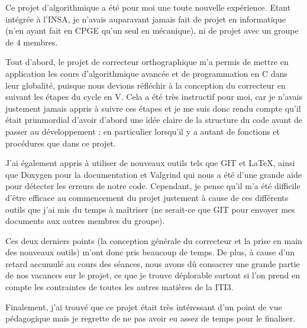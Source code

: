 	Ce projet d'algorithmique a été pour moi une toute nouvelle expérience. Etant intégrée à l'INSA, je n'avais auparavant jamais fait de projet en informatique (n'en ayant fait en CPGE qu'un seul en mécanique), ni de projet avec un groupe de 4 membres.
	
	Tout d'abord, le projet de correcteur orthographique m'a permis de mettre en application les cours d'algorithmique avancée et de programmation en C dans leur globalité, puisque nous devions réfléchir à la conception du correcteur en suivant les étapes du cycle en V. Cela a été très instructif pour moi, car je n'avais justement jamais appris à suivre ces étapes et je me suis donc rendu compte qu'il était primmordial d'avoir d'abord une idée claire de la structure du code avant de passer au développement ; en particulier lorsqu'il y a autant de fonctions et procédures que dans ce projet.
	
	J'ai également appris à utiliser de nouveaux outils tels que GIT et \LaTeX, ainsi que Doxygen pour la documentation et Valgrind qui nous a été d'une grande aide pour détecter les erreurs de notre code. Cependant, je pense qu'il m'a été difficile d'être efficace au commencement du projet justement à cause de ces différents outils que j'ai mis du temps à maîtriser (ne serait-ce que GIT pour envoyer mes documents aux autres membres du groupe).
	
	Ces deux derniers points (la conception générale du correcteur et la prise en main des nouveaux outils) m'ont donc pris beaucoup de temps. De plus, à cause d'un retard accumulé au cours des séances, nous avons dû consacrer une grande partie de nos vacances sur le projet, ce que je trouve déplorable surtout si l'on prend en compte les contraintes de toutes les autres matières de la ITI3.
	
	Finalement, j'ai trouvé que ce projet était très intéressant d'un point de vue pédagogique mais je regrette de ne pas avoir eu assez de temps pour le finaliser.